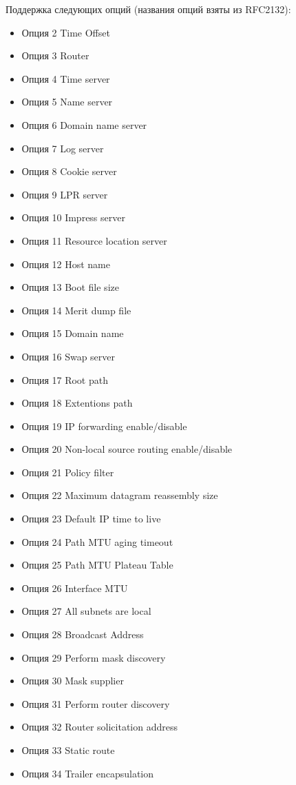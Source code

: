 \documentclass[14pt,a4paper]{extarticle}
\begin{document}
Поддержка следующих опций (названия опций взяты из RFC2132):
\begin{itemize}
    \item Опция 2 Time Offset
    \item Опция 3 Router
    \item Опция 4 Time server
    \item Опция 5 Name server
    \item Опция 6 Domain name server
    \item Опция 7 Log server
    \item Опция 8 Cookie server
    \item Опция 9 LPR server
    \item Опция 10 Impress server
    \item Опция 11 Resource location server
    \item Опция 12 Host name
    \item Опция 13 Boot file size
    \item Опция 14 Merit dump file
    \item Опция 15 Domain name
    \item Опция 16 Swap server
    \item Опция 17 Root path
    \item Опция 18 Extentions path
    \item Опция 19 IP forwarding enable/disable
    \item Опция 20 Non-local source routing enable/disable
    \item Опция 21 Policy filter
    \item Опция 22 Maximum datagram reassembly size
    \item Опция 23 Default IP time to live
    \item Опция 24 Path MTU aging timeout
    \item Опция 25 Path MTU Plateau Table
    \item Опция 26 Interface MTU
    \item Опция 27 All subnets are local
    \item Опция 28 Broadcast Address
    \item Опция 29 Perform mask discovery
    \item Опция 30 Mask supplier
    \item Опция 31 Perform router discovery
    \item Опция 32 Router solicitation address
    \item Опция 33 Static route
    \item Опция 34 Trailer encapsulation

\end{itemize}
\end{document}
